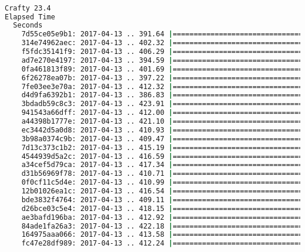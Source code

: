 \documentclass[french]{article}
\begin{document}
\begin{lstlisting}[language=bash,caption={Crafty 23.4}]

Crafty 23.4
Elapsed Time
  Seconds
    7d55ce05e9b1: 2017-04-13 .. 391.64 |====================================
    314e74962aec: 2017-04-13 .. 402.32 |=====================================
    f5fdc35141f9: 2017-04-13 .. 406.29 |=====================================
    ad7e270e4197: 2017-04-13 .. 394.59 |====================================
    0fa461813f89: 2017-04-13 .. 401.69 |=====================================
    6f26278ea07b: 2017-04-13 .. 397.22 |=====================================
    7fe03ee3e70a: 2017-04-13 .. 412.32 |======================================
    d4d9fa6392b1: 2017-04-13 .. 386.83 |====================================
    3bdadb59c8c3: 2017-04-13 .. 423.91 |=======================================
    941543a66dff: 2017-04-13 .. 412.00 |======================================
    a44398b1777e: 2017-04-13 .. 421.10 |=======================================
    ec3442d5a0d8: 2017-04-13 .. 410.93 |======================================
    3b98a0374c9b: 2017-04-13 .. 409.47 |======================================
    7d13c373c1b2: 2017-04-13 .. 415.19 |======================================
    4544939d5a2c: 2017-04-13 .. 416.59 |======================================
    a34cef5d79ca: 2017-04-13 .. 417.34 |======================================
    d31b56969f78: 2017-04-13 .. 410.71 |======================================
    0f0cf11c5d4e: 2017-04-13 .. 410.99 |======================================
    12b01026ea1c: 2017-04-13 .. 416.54 |======================================
    bde3832f4764: 2017-04-13 .. 409.11 |======================================
    d26bce03c5e4: 2017-04-13 .. 418.15 |======================================
    ae3bafd196ba: 2017-04-13 .. 412.92 |======================================
    84ade1fa26a3: 2017-04-13 .. 422.18 |=======================================
    164975aaa066: 2017-04-13 .. 413.58 |======================================
    fc47e28df989: 2017-04-13 .. 412.24 |======================================
\end{lstlisting}
\newpage
\end{document}
